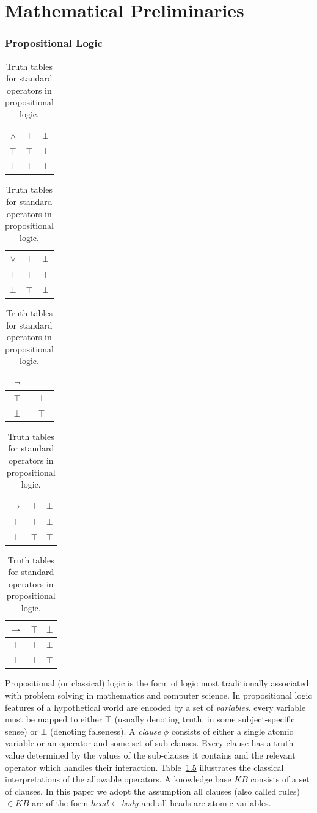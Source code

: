 \documentclass[
11pt, %
english, %
singlespacing, %
headsepline, %
]{MastersDoctoralThesis} %
\begin{document}
\chapter{Mathematical Preliminaries}
\subsection{Propositional Logic}

\begin{table}
\begin{center}


\begin{tabular}{ c | c c }
  $\land$& $\top$ & $\bot$ \\ \hline
 $\top$ & $\top$ & $\bot$ \\  
 $\bot$ & $\bot$ &  $\bot$
\end{tabular}
\quad
\begin{tabular}{ c | c c }
  $\lor$& $\top$ & $\bot$ \\ \hline
 $\top$ & $\top$ & $\top$ \\  
 $\bot$ & $\top$ &  $\bot$
\end{tabular}
\quad
\begin{tabular}{ c | c }
  $\lnot$& \\ \hline
 $\top$ & $\bot$ \\  
 $\bot$ & $\top$
\end{tabular}

\begin{tabular}{ c | c c }
  $\rightarrow$& $\top$ & $\bot$ \\ \hline
 $\top$ & $\top$ & $\bot$ \\  
 $\bot$ & $\top$ &  $\top$
\end{tabular}
\quad
\begin{tabular}{ c | c c }
  $\rightarrow$& $\top$ & $\bot$ \\ \hline
 $\top$ & $\top$ & $\bot$ \\  
 $\bot$ & $\bot$ &  $\top$
\end{tabular}

\caption{Truth tables for standard operators in propositional logic.}
\label{tbl:prop}

\end{center}
\end{table}

Propositional (or classical) logic is the form of logic most traditionally associated with problem solving in mathematics and computer science. In propositional logic features of a hypothetical world are encoded by a set of \textit{variables}. every variable must be mapped to either $\top$ (usually denoting truth, in some subject-specific sense) or $\bot$ (denoting falseness). A \textit{clause} $\phi$ consists of either a single atomic variable or an operator and some set of sub-clauses. Every clause has a truth value determined by the values of the sub-clauses it contains and the relevant operator which handles their interaction. Table~\ref{tbl:prop} illustrates the classical interpretations of the allowable operators. A knowledge base $KB$ consists of a set of clauses. In this paper we adopt the assumption all clauses (also called rules) $\in KB$ are of the form $head\leftarrow body$ and all heads are atomic variables.
\end{document}
